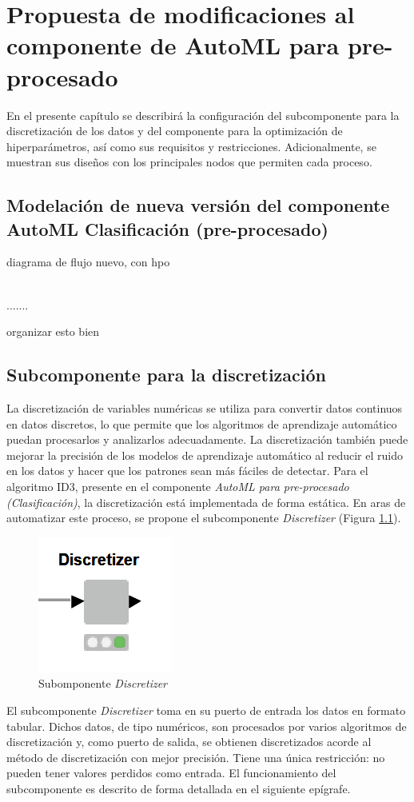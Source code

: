 \chapter{Propuesta de modificaciones al componente de AutoML para pre-procesado}\label{chap:2}
En el presente capítulo se describirá la configuración del subcomponente para la discretización de los datos y del componente para la optimización de hiperparámetros, así como sus requisitos y restricciones. Adicionalmente, se muestran sus diseños con los principales nodos que permiten cada proceso.

\section{Modelación de nueva versión del componente AutoML Clasificación (pre-procesado)}
diagrama de flujo nuevo, con hpo

\\
.......

organizar esto bien

\section{Subcomponente para la discretización}
La discretización de variables numéricas se utiliza para convertir datos continuos en datos discretos, lo que permite que los algoritmos de aprendizaje automático puedan procesarlos y analizarlos adecuadamente. La discretización también puede mejorar la precisión de los modelos de aprendizaje automático al reducir el ruido en los datos y hacer que los patrones sean más fáciles de detectar. Para el algoritmo ID3, presente en el componente \textit{AutoML para pre-procesado (Clasificación)}, la discretización está implementada de forma estática. En aras de automatizar este proceso, se propone el subcomponente \textit{Discretizer} (Figura \ref{fig:subcomp-disc}).

\begin{figure}[H]
	\centering
	\includegraphics[width=0.15\linewidth]{"figuras/capi 2/subcomp-disc"}
	\caption[Subomponente Discretizer]{Subomponente \textit{Discretizer}}
	\label{fig:subcomp-disc}
\end{figure}

El subcomponente \textit{Discretizer} toma en su puerto de entrada los datos en formato tabular. Dichos datos, de tipo numéricos, son procesados por varios algoritmos de discretización y, como puerto de salida, se obtienen discretizados acorde al método de discretización con mejor precisión. Tiene una única restricción: no pueden tener valores perdidos como entrada. El funcionamiento del subcomponente es descrito de forma detallada en el siguiente epígrafe. 


